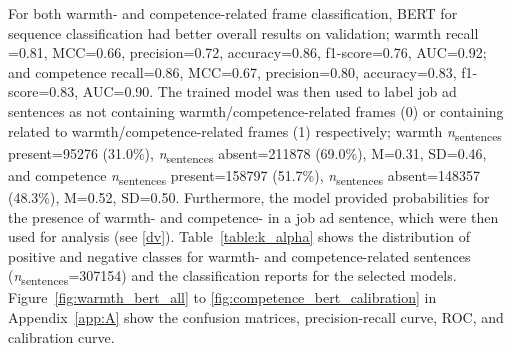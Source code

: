 \documentclass[man]{apa7}
\begin{document}
For both warmth- and competence-related frame classification, BERT for sequence classification had better overall results on validation; warmth recall =0.81, MCC=0.66, precision=0.72, accuracy=0.86, f1-score=0.76, AUC=0.92; and competence recall=0.86, MCC=0.67, precision=0.80, accuracy=0.83, f1-score=0.83, AUC=0.90.
The trained model was then used to label job ad sentences as not containing warmth/competence-related frames (0) or containing related to warmth/competence-related frames (1) respectively; warmth \textit{n}\textsubscript{sentences} present=95276 (31.0\%), \textit{n}\textsubscript{sentences} absent=211878 (69.0\%), M=0.31, SD=0.46, and competence \textit{n}\textsubscript{sentences} present=158797 (51.7\%), \textit{n}\textsubscript{sentences} absent=148357 (48.3\%), M=0.52, SD=0.50. Furthermore, the model provided probabilities for the presence of warmth- and competence- in a job ad sentence, which were then used for analysis (see \ref{dv}). Table~\ref{table:k_alpha} shows the distribution of positive and negative classes for warmth- and competence-related sentences (\textit{n}\textsubscript{sentences}=307154) and the classification reports for the selected models. Figure~\ref{fig:warmth_bert_all} to \ref{fig:competence_bert_calibration} in Appendix~\ref{app:A} show the confusion matrices, precision-recall curve, ROC, and calibration curve.
\end{document}
